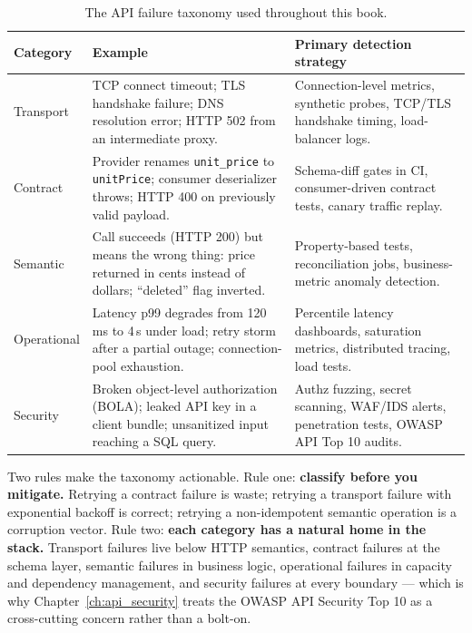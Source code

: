 \begin{table}[h]
  \centering
  \small
  \begin{tabularx}{\textwidth}{l X X}
    \toprule
    \textbf{Category} & \textbf{Example} & \textbf{Primary detection strategy} \\
    \midrule
    Transport &
      TCP connect timeout; TLS handshake failure; DNS resolution error;
      HTTP 502 from an intermediate proxy. &
      Connection-level metrics, synthetic probes, TCP/TLS handshake
      timing, load-balancer logs. \\
    Contract &
      Provider renames \texttt{unit\_price} to \texttt{unitPrice}; consumer
      deserializer throws; HTTP 400 on previously valid payload. &
      Schema-diff gates in CI, consumer-driven contract tests, canary
      traffic replay. \\
    Semantic &
      Call succeeds (HTTP 200) but means the wrong thing: price returned in
      cents instead of dollars; ``deleted'' flag inverted. &
      Property-based tests, reconciliation jobs, business-metric anomaly
      detection. \\
    Operational &
      Latency p99 degrades from 120\,ms to 4\,s under load; retry storm
      after a partial outage; connection-pool exhaustion. &
      Percentile latency dashboards, saturation metrics, distributed
      tracing, load tests. \\
    Security &
      Broken object-level authorization (BOLA); leaked API key in a client
      bundle; unsanitized input reaching a SQL query. &
      Authz fuzzing, secret scanning, WAF/IDS alerts, penetration tests,
      OWASP API Top 10 audits. \\
    \bottomrule
  \end{tabularx}
  \caption{The API failure taxonomy used throughout this book.}
  \label{tab:ch0-taxonomy}
\end{table}

Two rules make the taxonomy actionable. Rule one: \textbf{classify before you
mitigate.} Retrying a contract failure is waste; retrying a transport failure
with exponential backoff is correct; retrying a non-idempotent semantic
operation is a corruption vector. Rule two: \textbf{each category has a
natural home in the stack.} Transport failures live below HTTP semantics,
contract failures at the schema layer, semantic failures in business logic,
operational failures in capacity and dependency management, and security
failures at every boundary --- which is why Chapter~\ref{ch:api_security}
treats the OWASP API Security Top 10 as a cross-cutting concern rather than a
bolt-on.

